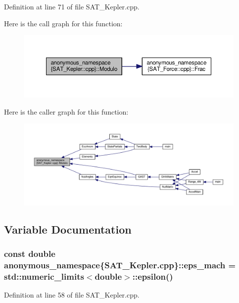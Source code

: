 Definition at line 71 of file S\-A\-T\-\_\-\-Kepler.\-cpp.



Here is the call graph for this function\-:\nopagebreak
\begin{figure}[H]
\begin{center}
\leavevmode
\includegraphics[width=350pt]{namespaceanonymous__namespace_02SAT__Kepler_8cpp_03_ae5d42531d691a174363f296c22d23217_cgraph}
\end{center}
\end{figure}




Here is the caller graph for this function\-:\nopagebreak
\begin{figure}[H]
\begin{center}
\leavevmode
\includegraphics[width=350pt]{namespaceanonymous__namespace_02SAT__Kepler_8cpp_03_ae5d42531d691a174363f296c22d23217_icgraph}
\end{center}
\end{figure}




\subsection{Variable Documentation}
\hypertarget{namespaceanonymous__namespace_02SAT__Kepler_8cpp_03_a4a19f0e7912b0c72da53321784af4b1b}{
\subsubsection[{eps\-\_\-mach}]{\setlength{\rightskip}{0pt plus 5cm}const double anonymous\-\_\-namespace\{S\-A\-T\-\_\-\-Kepler.\-cpp\}\-::eps\-\_\-mach = std\-::numeric\-\_\-limits$<$double$>$\-::epsilon()}}\label{namespaceanonymous__namespace_02SAT__Kepler_8cpp_03_a4a19f0e7912b0c72da53321784af4b1b}


Definition at line 58 of file S\-A\-T\-\_\-\-Kepler.\-cpp.

